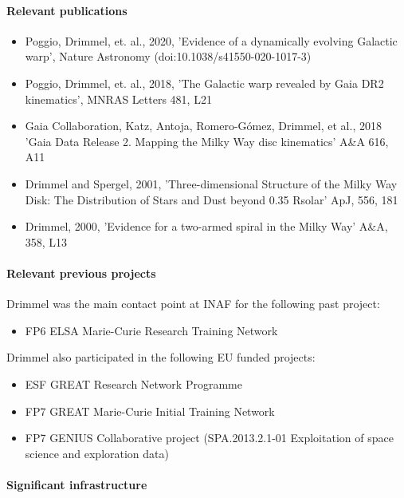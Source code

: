\paragraph{Relevant publications}
\begin{itemize}
    \item Poggio, Drimmel, et. al., 2020, 'Evidence of a dynamically evolving Galactic warp', Nature Astronomy (doi:10.1038/s41550-020-1017-3)
    \item Poggio, Drimmel, et. al., 2018, 'The Galactic warp revealed by Gaia DR2 kinematics', MNRAS Letters 481, L21
    \item  Gaia Collaboration, Katz, Antoja, Romero-G\'omez, Drimmel, et al., 2018 'Gaia Data Release 2. Mapping the Milky Way disc kinematics' A\&A 616, A11
    \item Drimmel and Spergel, 2001, 'Three-dimensional Structure of the Milky Way Disk: The Distribution of Stars and Dust beyond 0.35 Rsolar' ApJ, 556, 181
    \item Drimmel, 2000, 'Evidence for a two-armed spiral in the Milky Way' A\&A, 358, L13
\end{itemize}

\paragraph{Relevant previous projects}

Drimmel was the main contact point at INAF for the following past project:
\begin{itemize}
    \item FP6 ELSA Marie-Curie Research Training Network
\end{itemize}
Drimmel also participated in the following EU funded projects: 
\begin{itemize}
    \item ESF GREAT Research Network Programme 
    \item FP7 GREAT Marie-Curie Initial Training Network
    \item FP7 GENIUS Collaborative project (SPA.2013.2.1-01 Exploitation of space science and exploration data)
\end{itemize}


\paragraph{Significant infrastructure}